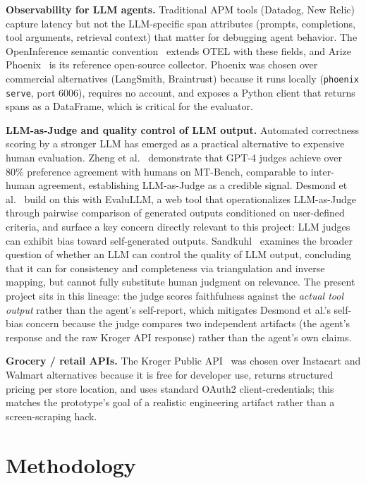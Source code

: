 \documentclass{article}
\begin{document}
\textbf{Observability for LLM agents.} Traditional APM tools (Datadog, New Relic) capture latency but not the LLM-specific span attributes (prompts, completions, tool arguments, retrieval context) that matter for debugging agent behavior. The OpenInference semantic convention~\citep{openinference2024} extends OTEL with these fields, and Arize Phoenix~\citep{arize2024phoenix} is its reference open-source collector. Phoenix was chosen over commercial alternatives (LangSmith, Braintrust) because it runs locally (\texttt{phoenix serve}, port 6006), requires no account, and exposes a Python client that returns spans as a DataFrame, which is critical for the evaluator.

\textbf{LLM-as-Judge and quality control of LLM output.} Automated correctness scoring by a stronger LLM has emerged as a practical alternative to expensive human evaluation. Zheng et al.~\citep{zheng2023judging} demonstrate that GPT-4 judges achieve over 80\% preference agreement with humans on MT-Bench, comparable to inter-human agreement, establishing LLM-as-Judge as a credible signal. Desmond et al.~\citep{desmond2024evalullm} build on this with EvaluLLM, a web tool that operationalizes LLM-as-Judge through pairwise comparison of generated outputs conditioned on user-defined criteria, and surface a key concern directly relevant to this project: LLM judges can exhibit bias toward self-generated outputs. Sandkuhl~\citep{sandkuhl2024quality} examines the broader question of whether an LLM can control the quality of LLM output, concluding that it can for consistency and completeness via triangulation and inverse mapping, but cannot fully substitute human judgment on relevance. The present project sits in this lineage: the judge scores faithfulness against the \emph{actual tool output} rather than the agent's self-report, which mitigates Desmond et al.'s self-bias concern because the judge compares two independent artifacts (the agent's response and the raw Kroger API response) rather than the agent's own claims.

\textbf{Grocery / retail APIs.} The Kroger Public API~\citep{krogerapi} was chosen over Instacart and Walmart alternatives because it is free for developer use, returns structured pricing per store location, and uses standard OAuth2 client-credentials; this matches the prototype's goal of a realistic engineering artifact rather than a screen-scraping hack.

\FloatBarrier
\section{Methodology}
\end{document}
